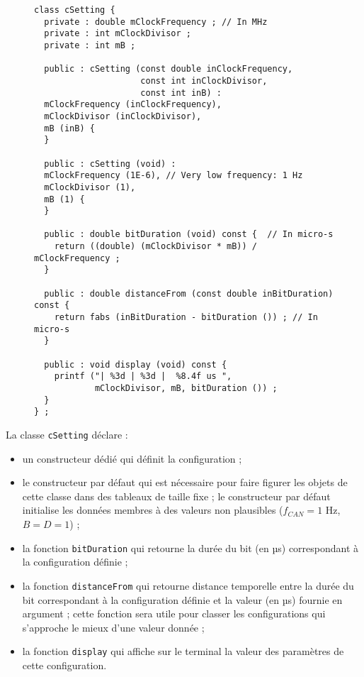 \begin{figure}[!ht]
\begin{lstlisting}
class cSetting {
  private : double mClockFrequency ; // In MHz
  private : int mClockDivisor ;
  private : int mB ;
  
  public : cSetting (const double inClockFrequency,
                     const int inClockDivisor,
                     const int inB) :
  mClockFrequency (inClockFrequency),
  mClockDivisor (inClockDivisor),
  mB (inB) {
  }
  
  public : cSetting (void) :
  mClockFrequency (1E-6), // Very low frequency: 1 Hz
  mClockDivisor (1),
  mB (1) {
  }

  public : double bitDuration (void) const {  // In micro-s
    return ((double) (mClockDivisor * mB)) / mClockFrequency ;
  }

  public : double distanceFrom (const double inBitDuration) const {
    return fabs (inBitDuration - bitDuration ()) ; // In micro-s
  }

  public : void display (void) const {
    printf ("| %3d | %3d |  %8.4f us ",
            mClockDivisor, mB, bitDuration ()) ;
  }
} ;
\end{lstlisting}
\end{figure}

La classe \texttt{cSetting} déclare :
\begin{itemize}
\item un constructeur dédié qui définit la configuration ;
\item le constructeur par défaut qui est nécessaire pour faire figurer les objets de cette classe dans des tableaux de taille fixe ; le constructeur par défaut initialise les données membres à des valeurs non plausibles ($f_{CAN} = 1$ Hz, $B = D = 1$)  ;
\item la fonction \texttt{bitDuration} qui retourne la durée du bit (en µs) correspondant à la configuration définie ;
\item la fonction \texttt{distanceFrom} qui retourne distance temporelle entre la durée du bit correspondant à la configuration définie et la valeur (en µs) fournie en argument ; cette fonction sera utile pour classer les configurations qui s'approche le mieux d'une valeur donnée ;
\item la fonction \texttt{display} qui affiche sur le terminal la valeur des paramètres de cette configuration.
\end{itemize}









